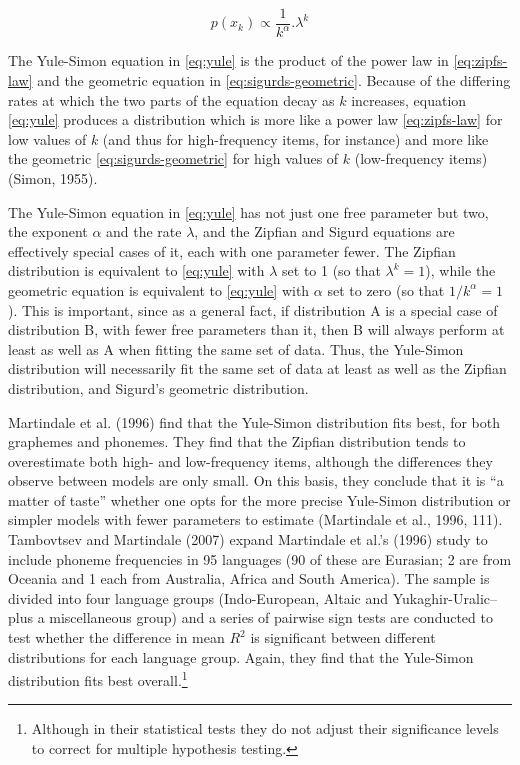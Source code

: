 \begin{equation}
p(x_k) \propto \frac{1}{k^\alpha}.\lambda^k
\label{eq:yule}
\end{equation}

The Yule-Simon equation in \eqref{eq:yule} is the product of the power law in \eqref{eq:zipfs-law} and the geometric equation in \eqref{eq:sigurds-geometric}. Because of the differing rates at which the two parts of the equation decay as \(k\) increases, equation \eqref{eq:yule} produces a distribution which is more like a power law \eqref{eq:zipfs-law} for low values of \(k\) (and thus for high-frequency items, for instance) and more like the geometric \eqref{eq:sigurds-geometric} for high values of \(k\) (low-frequency items) (Simon, 1955).

The Yule-Simon equation in \eqref{eq:yule} has not just one free parameter but two, the exponent \(\alpha\) and the rate \(\lambda\), and the Zipfian and Sigurd equations are effectively special cases of it, each with one parameter fewer. The Zipfian distribution is equivalent to \eqref{eq:yule} with \(\lambda\) set to 1 (so that \(\lambda^k = 1\)), while the geometric equation is equivalent to \eqref{eq:yule} with \(\alpha\) set to zero (so that \(1/k^\alpha = 1\)). This is important, since as a general fact, if distribution A is a special case of distribution B, with fewer free parameters than it, then B will always perform at least as well as A when fitting the same set of data. Thus, the Yule-Simon distribution will necessarily fit the same set of data at least as well as the Zipfian distribution, and Sigurd's geometric distribution.

Martindale et al. (1996) find that the Yule-Simon distribution fits best, for both graphemes and phonemes. They find that the Zipfian distribution tends to overestimate both high- and low-frequency items, although the differences they observe between models are only small. On this basis, they conclude that it is ``a matter of taste'' whether one opts for the more precise Yule-Simon distribution or simpler models with fewer parameters to estimate (Martindale et al., 1996, 111). Tambovtsev and Martindale (2007) expand Martindale et al.'s (1996) study to include phoneme frequencies in 95 languages (90 of these are Eurasian; 2 are from Oceania and 1 each from Australia, Africa and South America). The sample is divided into four language groups (Indo-European, Altaic and Yukaghir-Uralic--plus a miscellaneous group) and a series of pairwise sign tests are conducted to test whether the difference in mean \(R^2\) is significant between different distributions for each language group. Again, they find that the Yule-Simon distribution fits best overall.\footnote{Although in their statistical tests they do not adjust their significance levels to correct for multiple hypothesis testing.}

